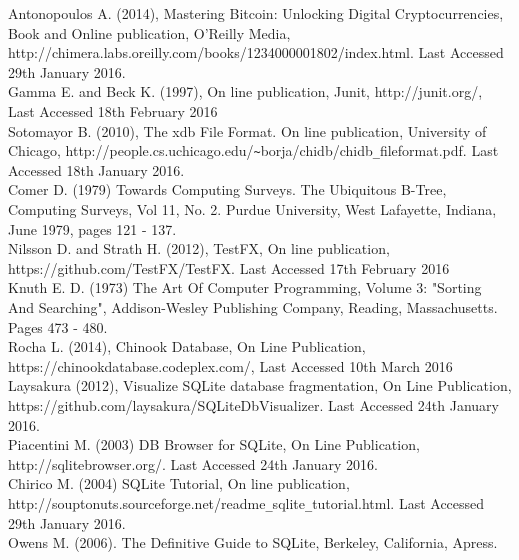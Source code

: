 \begin{thebibliography}{0}

Antonopoulos A. (2014), Mastering Bitcoin: Unlocking Digital Cryptocurrencies, Book and Online publication, O'Reilly Media, http://chimera.labs.oreilly.com/books/1234000001802/index.html. Last Accessed 29th January 2016.
\\
Gamma E. and Beck K. (1997), On line publication, Junit, http://junit.org/, Last Accessed 18th February 2016
\\
Sotomayor B. (2010), The xdb File Format. On line publication, University of Chicago, http://people.cs.uchicago.edu/\verb|~|borja/chidb/chidb\verb|_|fileformat.pdf. Last Accessed 18th January 2016.
\\
Comer D. (1979) Towards Computing Surveys. The Ubiquitous B-Tree, Computing Surveys, Vol 11, No. 2. Purdue University, West Lafayette, Indiana, June 1979, pages 121 - 137.
\\
Nilsson D. and Strath H. (2012), TestFX, On line publication, https://github.com/TestFX/TestFX. Last Accessed 17th February 2016
\\
Knuth E. D. (1973) The Art Of Computer Programming, Volume 3: "Sorting And Searching", Addison-Wesley Publishing Company, Reading, Massachusetts. Pages 473 - 480.
\\
Rocha L. (2014), Chinook Database, On Line Publication, https://chinookdatabase.codeplex.com/, Last Accessed 10th March 2016
\\
Laysakura (2012), Visualize SQLite database fragmentation, On Line Publication, https://github.com/laysakura/SQLiteDbVisualizer. Last Accessed 24th January 2016.
\\
Piacentini M. (2003) DB Browser for SQLite, On Line Publication, http://sqlitebrowser.org/. Last Accessed 24th January 2016.
\\
Chirico M. (2004) SQLite Tutorial, On line publication, http://souptonuts.sourceforge.net/readme\verb|_|sqlite\verb|_|tutorial.html. Last Accessed 29th January 2016.
\\
Owens M. (2006). The Definitive Guide to SQLite, Berkeley, California, Apress. 

\end{thebibliography}
